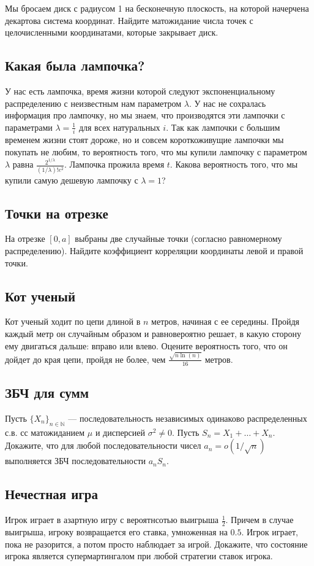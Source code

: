 \documentclass[12pt]{article}
\newcommand\N{\mathbb{N}}
\begin{document}
Мы бросаем диск с радиусом 1 на бесконечную плоскость, на которой начерчена декартова система координат. Найдите матожидание числа точек с целочисленными координатами, которые закрывает диск.



\subsection{Какая была лампочка?}

У нас есть лампочка, время жизни которой следуют экспоненциальному распределению с неизвестным нам параметром $\lambda$. У нас не сохралась информация про лампочку, но мы знаем, что производятся эти лампочки с параметрами $\lambda = \frac{1}{i}$ для всех натуральных $i$. Так как лампочки с большим временем жизни стоят дороже, но и совсем короткоживущие лампочки мы покупать не любим, то вероятность того, что мы купили лампочку с параметром $\lambda$ равна $\frac{2^{1/\lambda}}{(1/\lambda)!e^2}$. Лампочка прожила время $t$. Какова вероятность того, что мы купили самую дешевую лампочку с $\lambda = 1$?




\subsection{Точки на отрезке}

На отрезке $[0, a]$ выбраны две случайные точки (согласно равномерному распределению). Найдите коэффициент корреляции координаты левой и правой точки. 



\subsection{Кот ученый}

Кот ученый ходит по цепи длиной в $n$ метров, начиная с ее середины. Пройдя каждый метр он случайным образом и равновероятно решает, в какую сторону ему двигаться дальше: вправо или влево. Оцените вероятность того, что он дойдет до края цепи, пройдя не более, чем $\frac{\sqrt{n \ln(n)}}{16}$ метров.



\subsection{ЗБЧ для сумм}
Пусть $\{X_n\}_{n \in \N}$ --- последовательность независимых одинаково распределенных с.в. сс матожиданием $\mu$ и дисперсией $\sigma^2 \ne 0$. Пусть $S_n = X_1 + \dots + X_n$. Докажите, что для любой последовательности чисел $a_n = o(1/\sqrt{n})$ выполняется ЗБЧ последовательности $a_n S_n$.



\subsection{Нечестная игра}

Игрок играет в азартную игру с вероятнсотью выигрыша $\frac{1}{2}$. Причем в случае выигрыша, игроку возвращается его ставка, умноженная на $0.5$. Игрок играет, пока не разорится, а потом просто наблюдает за игрой. Докажите, что состояние игрока является супермартингалом при любой стратегии ставок игрока.
\end{document}

